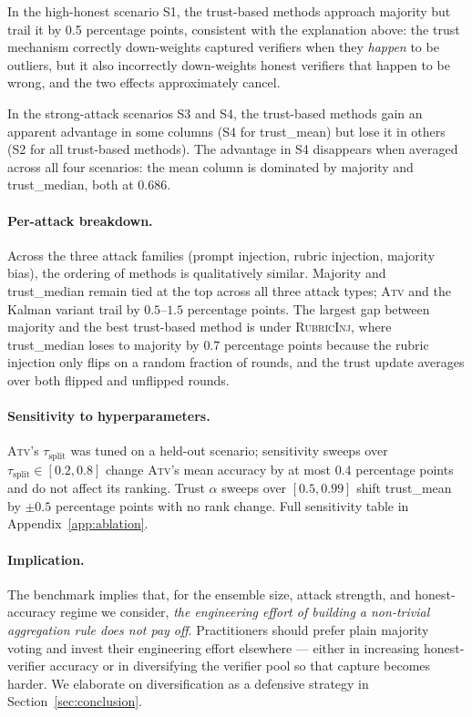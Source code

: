 \documentclass[11pt]{article}
\begin{document}
In the high-honest scenario S1, the trust-based methods approach
majority but trail it by 0.5 percentage points, consistent with the
explanation above: the trust mechanism correctly down-weights
captured verifiers when they \emph{happen} to be outliers, but it
also incorrectly down-weights honest verifiers that happen to be
wrong, and the two effects approximately cancel.

In the strong-attack scenarios S3 and S4, the trust-based methods
gain an apparent advantage in some columns (S4 for trust\_mean) but
lose it in others (S2 for all trust-based methods). The advantage in
S4 disappears when averaged across all four scenarios: the mean
column is dominated by majority and trust\_median, both at $0.686$.

\paragraph{Per-attack breakdown.}
Across the three attack families (prompt injection, rubric injection,
majority bias), the ordering of methods is qualitatively similar.
Majority and trust\_median remain tied at the top across all three
attack types; \textsc{Atv} and the Kalman variant trail by $0.5$--$1.5$
percentage points. The largest gap between majority and the best
trust-based method is under \textsc{RubricInj}, where trust\_median
loses to majority by $0.7$ percentage points because the rubric
injection only flips on a random fraction of rounds, and the trust
update averages over both flipped and unflipped rounds.

\paragraph{Sensitivity to hyperparameters.}
\textsc{Atv}'s $\tau_{\text{split}}$ was tuned on a held-out scenario;
sensitivity sweeps over $\tau_{\text{split}} \in [0.2, 0.8]$ change
\textsc{Atv}'s mean accuracy by at most $0.4$ percentage points and
do not affect its ranking. Trust $\alpha$ sweeps over $[0.5, 0.99]$
shift trust\_mean by $\pm 0.5$ percentage points with no rank
change. Full sensitivity table in
Appendix~\ref{app:ablation}.

\paragraph{Implication.}
The benchmark implies that, for the ensemble size, attack strength,
and honest-accuracy regime we consider, \emph{the engineering effort
of building a non-trivial aggregation rule does not pay off}.
Practitioners should prefer plain majority voting and invest their
engineering effort elsewhere --- either in increasing honest-verifier
accuracy or in diversifying the verifier pool so that capture becomes
harder. We elaborate on diversification as a defensive strategy in
Section~\ref{sec:conclusion}.
\end{document}

